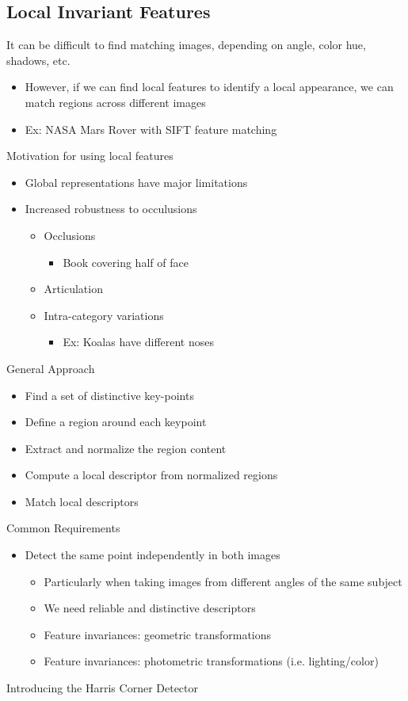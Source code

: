 \subsection{Local Invariant Features}
It can be difficult to find matching images, depending on angle, color hue, shadows, etc.
\begin{itemize}
    \item However, if we can find local features to identify a local appearance, we can match regions across different images
    \item Ex: NASA Mars Rover with SIFT feature matching
\end{itemize}
Motivation for using local features
\begin{itemize}
    \item Global representations have major limitations
    \item Increased robustness to occulusions
    \begin{itemize}
        \item Occlusions
        \begin{itemize}
            \item Book covering half of face
        \end{itemize}
        \item Articulation
        \item Intra-category variations
        \begin{itemize}
            \item Ex: Koalas have different noses
        \end{itemize}
    \end{itemize}
\end{itemize}
General Approach
\begin{itemize}
    \item Find a set of distinctive key-points
    \item Define a region around each keypoint
    \item Extract and normalize the region content
    \item Compute a local descriptor from normalized regions
    \item Match local descriptors
\end{itemize}
Common Requirements
\begin{itemize}
    \item Detect the same point independently in both images
    \begin{itemize}
        \item Particularly when taking images from different angles of the same subject
        \item We need reliable and distinctive descriptors
        \item Feature invariances: geometric transformations
        \item Feature invariances: photometric transformations (i.e. lighting/color)
    \end{itemize}
\end{itemize}
Introducing the Harris Corner Detector

